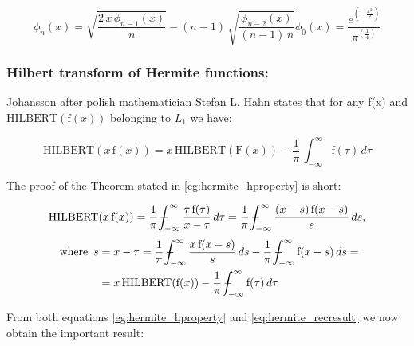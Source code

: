 \documentclass[12pt,twoside,a4paper]{article}
\numberwithin{equation}{subsection}
\numberwithin{figure}{subsection}
\def\Xint#1{\mathchoice
{\XXint\displaystyle\textstyle{#1}}%
{\XXint\textstyle\scriptstyle{#1}}%
{\XXint\scriptstyle\scriptscriptstyle{#1}}%
{\XXint\scriptscriptstyle\scriptscriptstyle{#1}}%
\!\int}
\def\XXint#1#2#3{{\setbox0=\hbox{$#1{#2#3}{\int}$ }\vcenter{\hbox{$#2#3$ }}\kern-.6\wd0}}
\def\dashint{\Xint-}
\begin{document}
\begin{subequations} \label{eq:hermite_recresult}
  \begin{equation}   \label{eq:hrr_weight}
    {\phi_{n}}(x)=\sqrt{\frac {2\,x\,{\phi_{n - 1}}(x)}{n}} - (n - 1)\,\sqrt{\frac {{\phi_{n - 2}}(x)}{(n - 1)\,n}}
  \end{equation}
  \begin{equation}   \label{eq:hrr_iter}
    {\phi_{0}}(x)=\frac {e^{( - \frac {x^{2}}{2})}}{\pi ^{(\frac {1}{4})}}
  \end{equation}
\end{subequations}

\subsubsection*{Hilbert transform of Hermite functions:}


Johansson after polish mathematician Stefan L. Hahn \cite{hahn_hilbert} states that for any f(x) and
$\mathrm{HILBERT}(\mathrm{f}(x))$ belonging to ${L_{1}}$ we have:

\begin{equation} \label{eg:hermite_hproperty}
  \mathrm{HILBERT}(x\,\mathrm{f}(x))=x\,\mathrm{HILBERT}(\mathrm{F}(x)) - \frac {1}{\pi }\,\int_{ - \infty }^{\infty
  }\mathrm{f}(\tau )\,d\tau 
\end{equation}

The proof of the Theorem stated in \ref{eg:hermite_hproperty} is short:

\begin{equation} \label{eq:hermite_hpropproof}
  \mathrm{HILBERT}(x\,\mathrm{f}(x)) = \frac{1}{\pi }\,\dashint_{ -\infty }^{\infty } \frac {\tau \,\mathrm{f}(\tau )}{x - \tau
  }\,d\tau  = \frac {1}{\pi }\,\dashint_{ - \infty }^{\infty }\frac {(x - s)\,\mathrm{f}(x - s)}{s}\,ds,
\end{equation}
\begin{alignat*}{1}
  \mbox { where }\,s &= x - \tau = \frac{1}{\pi }\,\dashint_{ -\infty }^{\infty }\frac {x\,\mathrm{f}(x - s)}{s}\,ds -
  \frac{1}{\pi }\, \dashint_{ -\infty }^{\infty }\mathrm{f}(x - s)\,ds = \\
  &= x\,\mathrm{HILBERT}(\mathrm{f}(x)) - \frac {1}{\pi }\,\dashint_{ - \infty}^{\infty }\mathrm{f}(\tau )\,d\tau 
\end{alignat*}

From both equations \ref{eg:hermite_hproperty} and \ref{eq:hermite_recresult} we now obtain the important result:
\end{document}
